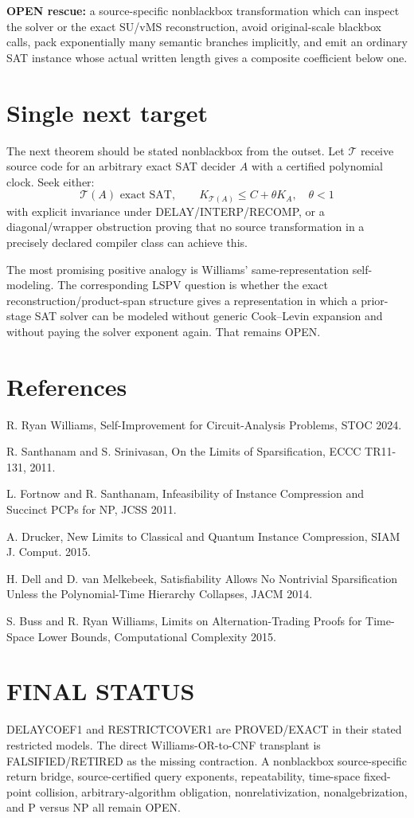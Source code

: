 \documentclass[11pt]{article}
\begin{document}
\textbf{OPEN rescue:} a source-specific nonblackbox transformation which can inspect the solver or the exact SU/vMS reconstruction, avoid original-scale blackbox calls, pack exponentially many semantic branches implicitly, and emit an ordinary SAT instance whose actual written length gives a composite coefficient below one.

\section*{Single next target}
The next theorem should be stated nonblackbox from the outset. Let \(\mathcal T\) receive source code for an arbitrary exact SAT decider \(A\) with a certified polynomial clock. Seek either:
\[
\boxed{
\mathcal T(A)\text{ exact SAT},\qquad
K_{\mathcal T(A)}\le C+\theta K_A,\quad\theta<1
}
\]
with explicit invariance under DELAY/INTERP/RECOMP, or a diagonal/wrapper obstruction proving that no source transformation in a precisely declared compiler class can achieve this.

The most promising positive analogy is Williams' same-representation self-modeling. The corresponding LSPV question is whether the exact reconstruction/product-span structure gives a representation in which a prior-stage SAT solver can be modeled without generic Cook--Levin expansion and without paying the solver exponent again. That remains OPEN.

\section*{References}
R. Ryan Williams, Self-Improvement for Circuit-Analysis Problems, STOC 2024.

R. Santhanam and S. Srinivasan, On the Limits of Sparsification, ECCC TR11-131, 2011.

L. Fortnow and R. Santhanam, Infeasibility of Instance Compression and Succinct PCPs for NP, JCSS 2011.

A. Drucker, New Limits to Classical and Quantum Instance Compression, SIAM J. Comput. 2015.

H. Dell and D. van Melkebeek, Satisfiability Allows No Nontrivial Sparsification Unless the Polynomial-Time Hierarchy Collapses, JACM 2014.

S. Buss and R. Ryan Williams, Limits on Alternation-Trading Proofs for Time-Space Lower Bounds, Computational Complexity 2015.

\section*{FINAL STATUS}
DELAYCOEF1 and RESTRICTCOVER1 are PROVED/EXACT in their stated restricted models. The direct Williams-OR-to-CNF transplant is FALSIFIED/RETIRED as the missing contraction. A nonblackbox source-specific return bridge, source-certified query exponents, repeatability, time-space fixed-point collision, arbitrary-algorithm obligation, nonrelativization, nonalgebrization, and P versus NP all remain OPEN.

\end{document}
